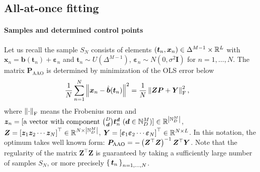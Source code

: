 \documentclass{article}
\begin{document}
\subsection{All-at-once fitting}\label{sec:all-at-once-fitting}
\paragraph{Samples and determined control points}
Let us recall the sample $S_N$ consists of elements $(\bm t_n, \bm x_n) \in \Delta^{M-1} \times \mathbb{R}^L$ with $\bm x_n = \bm b(\bm t_n) + \bm \varepsilon_n$ and $\bm t_n \sim U(\Delta^{M-1})$, $\bm \varepsilon_n \sim N(0, \sigma^2 \bm I)$ for $n = 1, \dots, N$.
The matrix $\bm P_\mathrm{AAO}$ is determined by minimization of the OLS error below
\begin{align}
\frac 1 N \sum_{n=1}^N \left\| \bm x_n - \hat{\bm b}(\bm t_n) \right\|^2 
&= \frac 1 N \left\|  \bm Z \bm P + \bm Y  \right\|_{\mathrm F}^2, \label{eqn:rss}
\end{align}
where $\left\| \cdot \right\|_\mathrm{F}$ means the Frobenius norm and
$\bm z_n = [\text{a vector with component } \binom{D}{\bm d}\bm t_n^{\bm d}~(\bm d\in \mathbb{N}_D^M)] \in \mathbb{R}^{\left| \mathbb{N}_D^M \right|}$, $\bm Z = \left[\bm z_1 \bm z_2 \cdots \bm z_N \right]^\top \in \mathbb{R}^{N \times \left| \mathbb{N}_D^M \right|}$, $\bm Y = \left[\bm \varepsilon_1 \bm \varepsilon_2\cdots \bm \varepsilon_N \right]^\top \in \mathbb{R}^{N \times L}$.
In this notation, the optimum takes well known form: $\bm P_\mathrm{AAO} = -\left( \bm Z^\top \bm Z \right)^{-1}\bm Z^\top \bm Y$.
Note that the regularity of the matrix $\bm Z^\top \bm Z$ is guaranteed by taking a sufficiently large number of samples $S_N$, or more precisely $\set{\bm t_n}_{n = 1, \dots, N}$.

\end{document}
